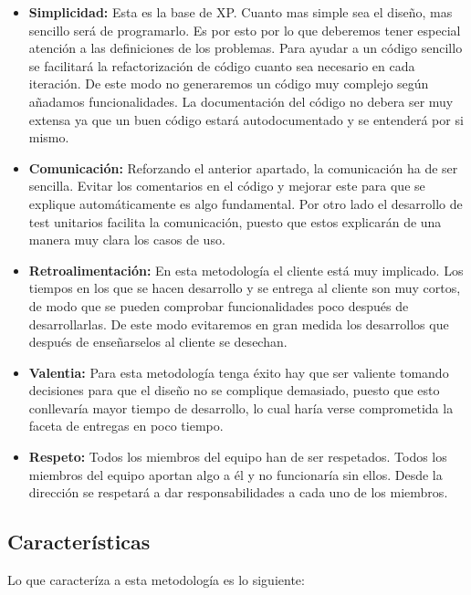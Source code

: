 \begin{itemize}
  \item \textbf{Simplicidad:} Esta es la base de XP. Cuanto mas simple sea el diseño, mas sencillo será de programarlo. Es por esto
    por lo que deberemos tener especial atención a las definiciones de los problemas. Para ayudar a un código sencillo se facilitará
    la refactorización de código cuanto sea necesario en cada iteración. De este modo no generaremos un código muy complejo según
    añadamos funcionalidades. La documentación del código no debera ser muy extensa ya que un buen código estará autodocumentado
    y se entenderá por si mismo.
  \item \textbf{Comunicación:} Reforzando el anterior apartado, la comunicación ha de ser sencilla. Evitar los comentarios
    en el código y mejorar este para que se explique automáticamente es algo fundamental. Por otro lado el desarrollo
    de test unitarios facilita la comunicación, puesto que estos explicarán de una manera muy clara los casos de uso.
  \item \textbf{Retroalimentación:} En esta metodología el cliente está muy implicado. Los tiempos en los que se hacen
    desarrollo y se entrega al cliente son muy cortos, de modo que se pueden comprobar funcionalidades poco después
    de desarrollarlas. De este modo evitaremos en gran medida los desarrollos que después de enseñarselos al cliente se desechan.
  \item \textbf{Valentia:} Para esta metodología tenga éxito hay que ser valiente tomando decisiones para que el diseño no se complique
    demasiado, puesto que esto conllevaría mayor tiempo de desarrollo, lo cual haría verse comprometida la faceta de entregas
    en poco tiempo.
  \item \textbf{Respeto:} Todos los miembros del equipo han de ser respetados. Todos los miembros del equipo aportan
    algo a él y no funcionaría sin ellos. Desde la dirección se respetará a dar responsabilidades a cada uno de los miembros.
\end{itemize}

\subsection{Características}

Lo que caracteríza a esta metodología es lo siguiente:

